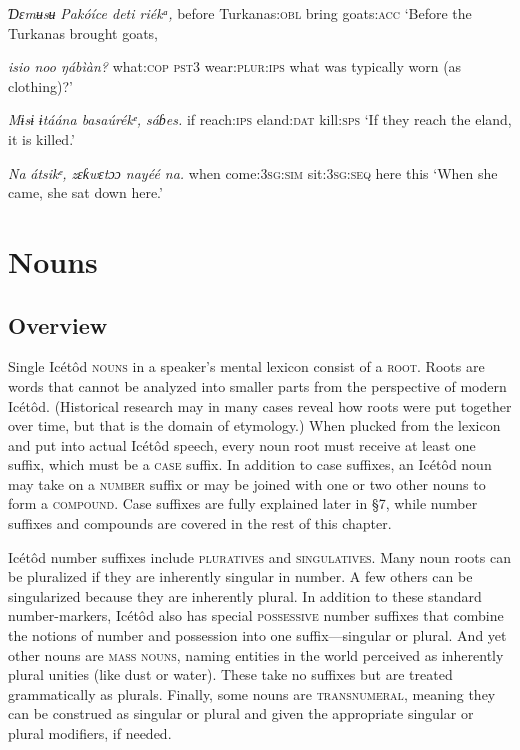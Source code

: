 \textit{Ɗ}\textit{ɛmʉsʉ}\textit{   Pakóíce     deti   riékᵃ,}
before   Turkanas:\textsc{obl}   bring   goats:\textsc{acc}
‘Before the Turkanas brought goats,



\textit{isio     noo   ŋábìàn?}
what:\textsc{cop}   \textsc{pst3}   wear:\textsc{plur:ips}
what was typically worn (as clothing)?’




\textit{Mɨsɨ}\textit{   ɨtáána   basaúrékᵉ,   sáɓes.}
if   reach:\textsc{ips}   eland:\textsc{dat}   kill:\textsc{sps}
‘If they reach the eland, it is killed.’




\textit{Na}\textit{   átsikᵉ,       zɛƙwɛtɔɔ   nayéé   na.}
when   come:\textsc{3sg:sim}   sit:\textsc{3sg:seq}   here   this
‘When she came, she sat down here.’




\section{Nouns}



\subsection{Overview}


Single Icétôd \textsc{nouns} in a speaker’s mental lexicon consist of a \textsc{root.} Roots are words that cannot be analyzed into smaller parts from the perspective of modern Icétôd. (Historical research may in many cases reveal how roots were put together over time, but that is the domain of etymology.) When plucked from the lexicon and put into actual Icétôd speech, every noun root must receive at least one suffix, which must be a \textsc{case} suffix. In addition to case suffixes, an Icétôd noun may take on a \textsc{number} suffix or may be joined with one or two other nouns to form a \textsc{compound}. Case suffixes are fully explained later in §7, while number suffixes and compounds are covered in the rest of this chapter.

Icétôd number suffixes include \textsc{pluratives} and \textsc{singulatives}. Many noun roots can be pluralized if they are inherently singular in number. A few others can be singularized because they are inherently plural. In addition to these standard number-markers, Icétôd also has special \textsc{possessive} number suffixes that combine the notions of number and possession into one suffix—singular or plural. And yet other nouns are \textsc{mass} \textsc{nouns}, naming entities in the world perceived as inherently plural unities (like dust or water). These take no suffixes but are treated grammatically as plurals. Finally, some nouns are \textsc{transnumeral}, meaning they can be construed as singular or plural and given the appropriate singular or plural modifiers, if needed. 

